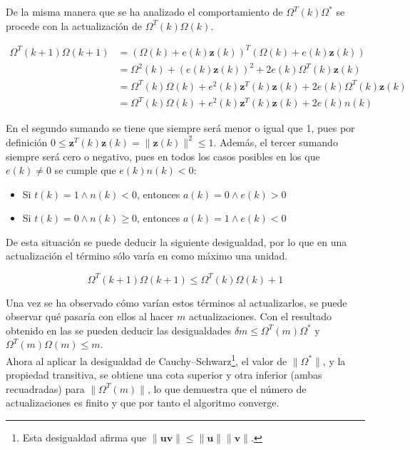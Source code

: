 		De la misma manera que se ha analizado el comportamiento de $\Omega^T(k) \Omega^*$ se procede con la actualización de $\Omega^T(k)\Omega(k)$. 
		
		\begin{align*}
			\Omega^T(k+1)\Omega(k+1) &= (\Omega(k) + e(k)\textbf{z}(k))^T(\Omega(k) + e(k)\textbf{z}(k))\\
			&= \Omega^2(k) + (e(k)\textbf{z}(k))^2 + 2e(k)\Omega^T(k)\textbf{z}(k)\\
			&= \Omega^T(k)\Omega(k) + e^2(k)\textbf{z}^T(k)\textbf{z}(k) + 2e(k)\Omega^T(k)\textbf{z}(k)\\
			&= \Omega^T(k)\Omega(k) + e^2(k)\textbf{z}^T(k)\textbf{z}(k) + 2e(k)n(k)
		\end{align*}
		
		En el segundo sumando se tiene que siempre será menor o igual que 1, pues por definición $0 \leq \textbf{z}^T(k)\textbf{z}(k) = \|\textbf{z}(k)\|^2 \leq 1$. Además, el tercer sumando siempre será cero o negativo, pues en todos los casos posibles en los que $e(k) \neq 0$ se cumple que $e(k)n(k) < 0$: 
		
		\begin{itemize}
			\item Si $t(k) = 1 \land n(k) < 0$, entonces $a(k) = 0 \land e(k) > 0$
			\item Si $t(k) = 0 \land n(k) \geq 0$, entonces $a(k) = 1 \land e(k) < 0$
		\end{itemize}
		
		De esta situación se puede deducir la siguiente desigualdad, por lo que en una actualización el término sólo varía en como máximo una unidad.   
		
		\begin{equation}
			\label{eq:sup_delta}
			\Omega^T(k+1)\Omega(k+1) \leq \Omega^T(k)\Omega(k) + 1
		\end{equation}
		
		Una vez se ha observado cómo varían estos términos al actualizarlos, se puede observar qué pasaría con ellos al hacer $m$ actualizaciones. Con el resultado obtenido en las  se pueden deducir las desigualdades $\delta m \leq \Omega^T(m)\Omega^*$ y $\Omega^T(m)\Omega(m) \leq m$. \\
		
		Ahora al aplicar la desigualdad de Cauchy--Schwarz\footnote{Esta desigualdad afirma que $\|\textbf{u}\textbf{v}\| \leq \|\textbf{u}\|\|\textbf{v}\|$. }, el valor de $\|\Omega^*\|$, y la propiedad transitiva, se obtiene una cota superior y otra inferior (ambas recuadradas) para $\|\Omega^T(m)\|$, lo que demuestra que el número de actualizaciones es finito y que por tanto el algoritmo converge. 
		
